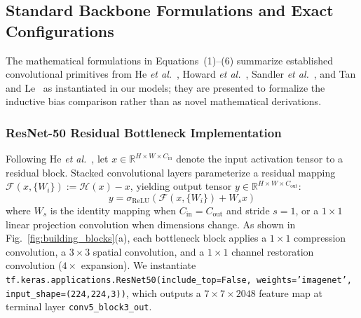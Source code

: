 \documentclass[journal]{IEEEtran}
\begin{document}
\subsection{Standard Backbone Formulations and Exact Configurations}
The mathematical formulations in Equations~(1)--(6) summarize established convolutional primitives from He \textit{et al.}~\cite{he2016}, Howard \textit{et al.}~\cite{howard2017}, Sandler \textit{et al.}~\cite{sandler2018}, and Tan and Le~\cite{tan2019} as instantiated in our models; they are presented to formalize the inductive bias comparison rather than as novel mathematical derivations.

\subsubsection{ResNet-50 Residual Bottleneck Implementation}
Following He \textit{et al.}~\cite{he2016}, let $x \in \mathbb{R}^{H \times W \times C_{\text{in}}}$ denote the input activation tensor to a residual block. Stacked convolutional layers parameterize a residual mapping $\mathcal{F}(x, \{W_i\}) := \mathcal{H}(x) - x$, yielding output tensor $y \in \mathbb{R}^{H \times W \times C_{\text{out}}}$:
\begin{equation}
y = \sigma_{\text{ReLU}}\left(\mathcal{F}(x, \{W_i\}) + W_s x\right)
\end{equation}
where $W_s$ is the identity mapping when $C_{\text{in}} = C_{\text{out}}$ and stride $s=1$, or a $1\times 1$ linear projection convolution when dimensions change. As shown in Fig.~\ref{fig:building_blocks}(a), each bottleneck block applies a $1\times 1$ compression convolution, a $3\times 3$ spatial convolution, and a $1\times 1$ channel restoration convolution ($4\times$ expansion). We instantiate \texttt{tf.keras.applications.ResNet50(include\_top=False, weights='imagenet', input\_shape=(224,224,3))}, which outputs a $7 \times 7 \times 2048$ feature map at terminal layer \texttt{conv5\_block3\_out}.
\end{document}
